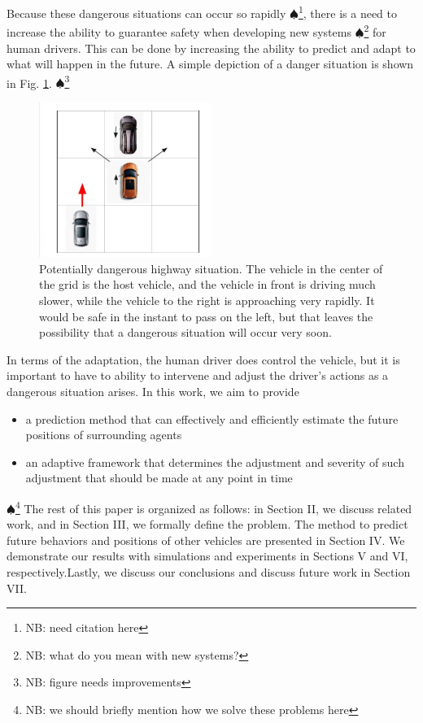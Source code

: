 \documentclass[conference]{IEEEtran}
\newcommand\NB[1]{$\spadesuit$\footnote{NB: #1}}
\begin{document}
    Because these dangerous situations can occur so rapidly \NB{need citation here}, there is a need to increase the ability to guarantee safety when developing new systems \NB{what do you mean with new systems?} for human drivers. This can be done by increasing the ability to predict and adapt to what will happen in the future. A simple depiction of a danger situation is shown in Fig. \ref{fig:hiway}. \NB{figure needs improvements}

\begin{figure}[ht]
    \includegraphics[width=0.5\textwidth]{highwaysit.JPG}
    \caption{Potentially dangerous highway situation. The vehicle in the center of the grid is the host vehicle, and the vehicle in front is driving much slower, while the vehicle to the right is approaching very rapidly. It would be safe in the instant to pass on the left, but that leaves the possibility that a dangerous situation will occur very soon.}
    \label{fig:hiway}
\end{figure}
    
    In terms of the adaptation, the human driver does control the vehicle, but it is important to have to ability to intervene and adjust the driver's actions as a dangerous situation arises. In this work, we aim to provide
    \begin{itemize}
    \item{a prediction method that can effectively and efficiently estimate the future positions of surrounding agents}
    \item{an adaptive framework that determines the adjustment and severity of such adjustment that should be made at any point in time}
    \end{itemize}
  
  \NB{we should briefly mention how we solve these problems here}  
    The rest of this paper is organized as follows: in Section II, we discuss related work, and in Section III, we formally define the problem. The method to predict future behaviors and positions of other vehicles are presented in Section IV. We demonstrate our results with simulations and experiments in Sections V and VI, respectively.Lastly, we discuss our conclusions and discuss future work in Section VII.
\end{document}
